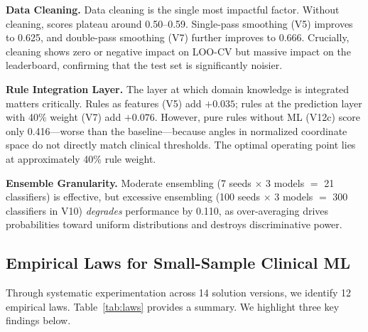 \noindent\textbf{Data Cleaning.}
Data cleaning is the single most impactful factor. Without cleaning, scores plateau around 0.50--0.59. Single-pass smoothing (V5) improves to 0.625, and double-pass smoothing (V7) further improves to 0.666. Crucially, cleaning shows zero or negative impact on LOO-CV but massive impact on the leaderboard, confirming that the test set is significantly noisier.

\noindent\textbf{Rule Integration Layer.}
The layer at which domain knowledge is integrated matters critically. Rules as features (V5) add $+0.035$; rules at the prediction layer with 40\% weight (V7) add $+0.076$. However, pure rules without ML (V12c) score only 0.416---worse than the baseline---because angles in normalized coordinate space do not directly match clinical thresholds. The optimal operating point lies at approximately 40\% rule weight.

\noindent\textbf{Ensemble Granularity.}
Moderate ensembling (7 seeds $\times$ 3 models $=$ 21 classifiers) is effective, but excessive ensembling (100 seeds $\times$ 3 models $=$ 300 classifiers in V10) \textit{degrades} performance by 0.110, as over-averaging drives probabilities toward uniform distributions and destroys discriminative power.

\subsection{Empirical Laws for Small-Sample Clinical ML}
\label{sec:laws}

Through systematic experimentation across 14 solution versions, we identify 12 empirical laws. Table~\ref{tab:laws} provides a summary. We highlight three key findings below.

